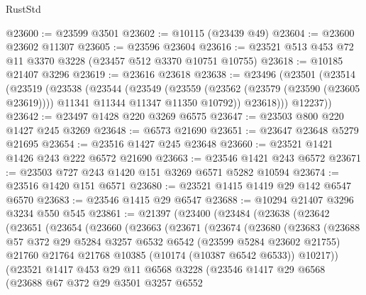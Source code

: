 \begin{lexlean}{RustStd}
\begin{coremodule}
@23600 := @23599 @3501
@23602 := @10115 (@23439 @49)
@23604 := @23600 @23602 @11307
@23605 := @23596 @23604
@23616 := @23521 @513 @453 @72 @11 @3370 @3228 (@23457 @512 @3370 @10751 @10755)
@23618 := @10185 @21407 @3296
@23619 := @23616 @23618
@23638 := @23496
    (@23501
      (@23514
        (@23519
          (@23538
            (@23544
              (@23549
                (@23559
                  (@23562 (@23579 (@23590 (@23605 @23619))))
                  @11341
                  @11344
                  @11347
                  @11350
                  @10792))
              @23618)))
        @12237))
@23642 := @23497 @1428 @220 @3269 @6575
@23647 := @23503 @800 @220 @1427 @245 @3269
@23648 := @6573 @21690
@23651 := @23647 @23648 @5279 @21695
@23654 := @23516 @1427 @245 @23648
@23660 := @23521 @1421 @1426 @243 @222 @6572 @21690
@23663 := @23546 @1421 @243 @6572
@23671 := @23503 @727 @243 @1420 @151 @3269 @6571 @5282 @10594
@23674 := @23516 @1420 @151 @6571
@23680 := @23521 @1415 @1419 @29 @142 @6547 @6570
@23683 := @23546 @1415 @29 @6547
@23688 := @10294 @21407 @3296 @3234 @550 @545
@23861 := @21397
    (@23400
      (@23484
        (@23638
          (@23642
            (@23651
              (@23654
                (@23660
                  (@23663
                    (@23671
                      (@23674
                        (@23680
                          (@23683
                            (@23688
                              @57
                              @372
                              @29
                              @5284
                              @3257
                              @6532
                              @6542
                              (@23599 @5284 @23602 @21755)
                              @21760
                              @21764
                              @21768
                              @10385
                              (@10174 (@10387 @6542 @6533))
                              @10217))
                          (@23521
                            @1417
                            @453
                            @29
                            @11
                            @6568
                            @3228
                            (@23546
                              @1417
                              @29
                              @6568
                              (@23688
                                @67
                                @372
                                @29
                                @3501
                                @3257
                                @6552

\end{coremodule}
\end{lexlean}
